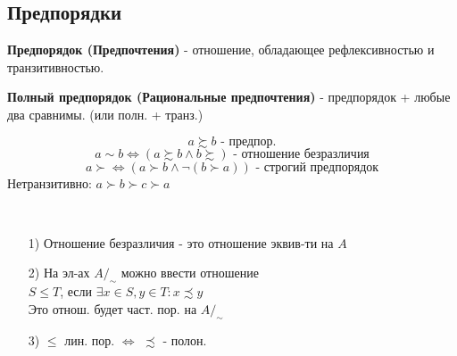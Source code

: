 \subsection{Предпорядки}
\begin{definition}
\textbf{Предпорядок (Предпочтения)} - отношение, обладающее рефлексивностью и транзитивностью.
\end{definition}
\begin{definition}
  \textbf{Полный предпорядок (Рациональные предпочтения)} - предпорядок + любые два сравнимы. (или полн. + транз.)
\end{definition}
\begin{symb}
\[
a \succsim b \text{ - предпор.}
\]
\[
a \sim b \iff (a \succsim b \land b \succsim) \text{ - отношение безразличия} 
\]
\[
a \succ \iff (a \succ b \land \neg(b \succ a)) \text{ - строгий предпорядок}
\]
Нетранзитивно: $a \succ b \succ c \succ a$
\end{symb}
\begin{theorem}
  ~\newline
\begin{itemize}
  \item [1) ] Отношение безразличия - это отношение эквив-ти на $A$
  \item [2) ] На эл-ах $A/_{\sim}$ можно ввести отношение \\
    $S \leq T$, если $\exists x \in S, y \in T \colon x \precsim y$ \\
    Это отнош. будет част. пор. на $A/_{\sim}$
  \item [3) ] $\leq$ лин. пор. $\iff$ $\precsim$ - полон.
\end{itemize}
\end{theorem}
